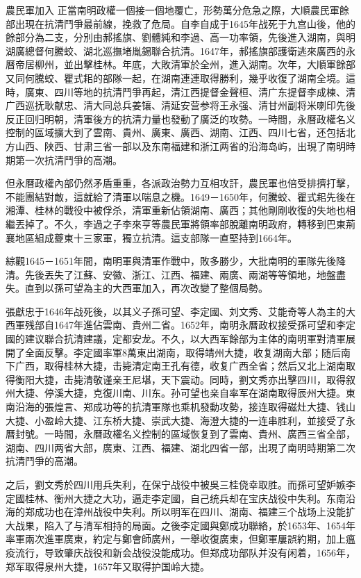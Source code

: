 農民軍加入
正當南明政權一個接一個地覆亡，形勢萬分危急之際，大順農民軍餘部出現在抗清鬥爭最前線，挽救了危局。自李自成于1645年战死于九宫山後，他的餘部分為二支，分別由郝搖旗、劉體純和李過、高一功率領，先後進入湖南，與明湖廣總督何騰蛟、湖北巡撫堵胤錫聯合抗清。1647年，郝搖旗部護衛逃來廣西的永曆帝居柳州，並出擊桂林。年底，大敗清軍於全州，進入湖南。次年，大順軍餘部又同何騰蛟、瞿式耜的部隊一起，在湖南連連取得勝利，幾乎收復了湖南全境。這時，廣東、四川等地的抗清鬥爭再起，清江西提督金聲桓、清广东提督李成棟、清广西巡抚耿献忠、清大同总兵姜镶、清延安营参将王永强、清甘州副将米喇印先後反正回归明朝，清軍後方的抗清力量也發動了廣泛的攻勢。一時間，永曆政權名义控制的區域擴大到了雲南、貴州、廣東、廣西、湖南、江西、四川七省，还包括北方山西、陕西、甘肃三省一部以及东南福建和浙江两省的沿海岛屿，出現了南明時期第一次抗清鬥爭的高潮。

但永曆政權內部仍然矛盾重重，各派政治勢力互相攻訐，農民軍也倍受排擠打擊，不能團結對敵，這就給了清軍以喘息之機。1649－1650年，何騰蛟、瞿式耜先後在湘潭、桂林的戰役中被俘杀，清軍重新佔領湖南、廣西；其他剛剛收復的失地也相繼丟掉了。不久，李過之子李來亨等農民軍將領率部脫離南明政府，轉移到巴東荊襄地區組成夔東十三家軍，獨立抗清。這支部隊一直堅持到1664年。

綜觀1645－1651年間，南明軍與清軍作戰中，敗多勝少，大批南明的軍隊先後降清。先後丟失了江蘇、安徽、浙江、江西、福建、兩廣、兩湖等等領地，地盤盡失。直到以孫可望為主的大西軍加入，再次改變了整個局勢。

張獻忠于1646年战死後，以其义子孫可望、李定國、刘文秀、艾能奇等人為主的大西軍残部自1647年進佔雲南、貴州二省。1652年，南明永曆政权接受孫可望和李定國的建议聯合抗清建議，定都安龙。不久，以大西军餘部为主体的南明軍對清軍展開了全面反擊。李定國率軍8萬東出湖南，取得靖州大捷，收复湖南大部；随后南下广西，取得桂林大捷，击毙清定南王孔有德，收复广西全省；然后又北上湖南取得衡阳大捷，击毙清敬谨亲王尼堪，天下震动。同時，劉文秀亦出擊四川，取得叙州大捷、停溪大捷，克復川南、川东。孙可望也亲自率军在湖南取得辰州大捷。東南沿海的張煌言、郑成功等的抗清軍隊也乘机發動攻勢，接连取得磁灶大捷、钱山大捷、小盈岭大捷、江东桥大捷、崇武大捷、海澄大捷的一连串胜利，並接受了永曆封號。一時間，永曆政權名义控制的區域恢复到了雲南、貴州、廣西三省全部，湖南、四川两省大部，廣東、江西、福建、湖北四省一部，出現了南明時期第二次抗清鬥爭的高潮。

之后，劉文秀於四川用兵失利，在保宁战役中被吳三桂侥幸取胜。而孫可望妒嫉李定國桂林、衡州大捷之大功，逼走李定國，自己统兵却在宝庆战役中失利。东南沿海的郑成功也在漳州战役中失利。所以明军在四川、湖南、福建三个战场上没能扩大战果，陷入了与清军相持的局面。之後李定國與鄭成功聯絡，於1653年、1654年率軍兩次進軍廣東，約定与鄭會師廣州，一舉收復廣東，但鄭軍屢誤約期，加上瘟疫流行，导致肇庆战役和新会战役没能成功。但郑成功部队并没有闲着，1656年，郑军取得泉州大捷，1657年又取得护国岭大捷。

